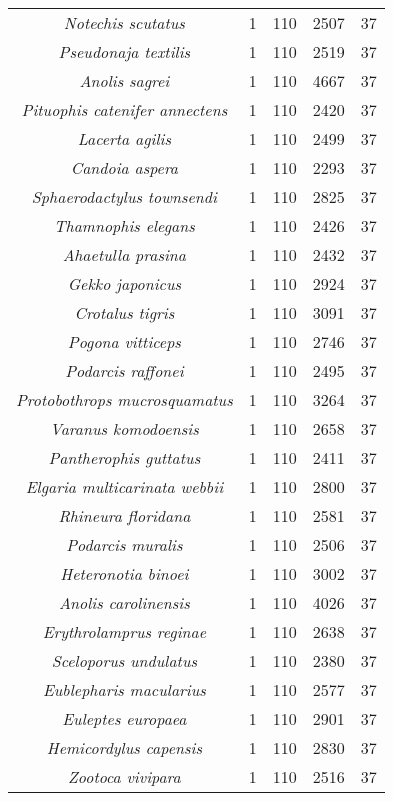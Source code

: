 \begin{longtable}[c]{|c|c|c|c|c|}
\textit{Notechis scutatus}             & 1 & 110 & 2507 & 37 \\
\textit{Pseudonaja textilis}           & 1 & 110 & 2519 & 37 \\
\textit{Anolis sagrei}                 & 1 & 110 & 4667 & 37 \\
\textit{Pituophis catenifer annectens} & 1 & 110 & 2420 & 37 \\
\textit{Lacerta agilis}                & 1 & 110 & 2499 & 37 \\
\textit{Candoia aspera}                & 1 & 110 & 2293 & 37 \\
\textit{Sphaerodactylus townsendi}     & 1 & 110 & 2825 & 37 \\
\textit{Thamnophis elegans}            & 1 & 110 & 2426 & 37 \\
\textit{Ahaetulla prasina}             & 1 & 110 & 2432 & 37 \\
\textit{Gekko japonicus}               & 1 & 110 & 2924 & 37 \\
\textit{Crotalus tigris}               & 1 & 110 & 3091 & 37 \\
\textit{Pogona vitticeps}              & 1 & 110 & 2746 & 37 \\
\textit{Podarcis raffonei}             & 1 & 110 & 2495 & 37 \\
\textit{Protobothrops mucrosquamatus}  & 1 & 110 & 3264 & 37 \\
\textit{Varanus komodoensis}           & 1 & 110 & 2658 & 37 \\
\textit{Pantherophis guttatus}         & 1 & 110 & 2411 & 37 \\
\textit{Elgaria multicarinata webbii}  & 1 & 110 & 2800 & 37 \\
\textit{Rhineura floridana}            & 1 & 110 & 2581 & 37 \\
\textit{Podarcis muralis}              & 1 & 110 & 2506 & 37 \\
\textit{Heteronotia binoei}            & 1 & 110 & 3002 & 37 \\
\textit{Anolis carolinensis}           & 1 & 110 & 4026 & 37 \\
\textit{Erythrolamprus reginae}        & 1 & 110 & 2638 & 37 \\
\textit{Sceloporus undulatus}          & 1 & 110 & 2380 & 37 \\
\textit{Eublepharis macularius}        & 1 & 110 & 2577 & 37 \\
\textit{Euleptes europaea}             & 1 & 110 & 2901 & 37 \\
\textit{Hemicordylus capensis}         & 1 & 110 & 2830 & 37 \\
\textit{Zootoca vivipara}              & 1 & 110 & 2516 & 37 \\ \hline
\end{longtable}
